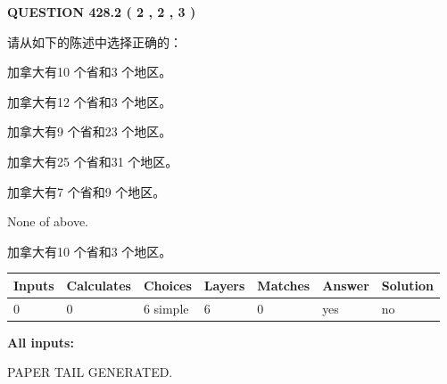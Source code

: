 \documentclass{ctexart}
\begin{document}
   
  
\vspace{0.2in}
  
{\textbf{\Large{QUESTION
428.2 
 ( 2 , 2 , 3 )
}}}
  
  
请从如下的陈述中选择正确的：
 
 
加拿大有10 个省和3 个地区。
 
 
加拿大有12 个省和3 个地区。
 
 
加拿大有9 个省和23 个地区。
 
 
加拿大有25 个省和31 个地区。
 
 
加拿大有7 个省和9 个地区。
 
 
 None of above.
 
 
\noindent{}
 
 
加拿大有10 个省和3 个地区。
 
 
\noindent{}
 
 
   
   
   
   
\noindent\begin{tabular}{|l|l|l|l|l|l|l|}
 \hline
Inputs & Calculates & Choices & Layers & Matches & Answer & Solution \\ \hline
 0  & 
 0  & 
 6
  simple  
  & 
 6  & 
 0  & 
  yes & 
  no 
  \\ \hline
 \end{tabular}
   
   
   
   
\noindent{}
   
   
   
   
\noindent\vspace{0.1in}\hspace{-0.08in} {\textbf{\Large{All inputs: }}}
   
   
   
   
   
   
 \vspace{0.2in}
 
   
   
\vspace{2.0in} PAPER TAIL GENERATED.
   
\end{document}
